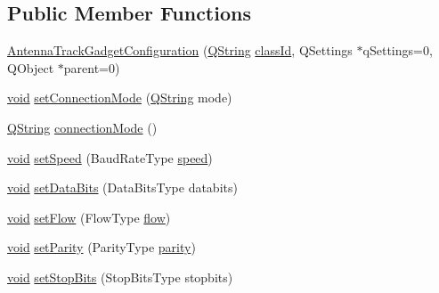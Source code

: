 \subsection*{\-Public \-Member \-Functions}
\begin{DoxyCompactItemize}
\item 
\hyperlink{group___antenna_track_gadget_plugin_gaab0b8cb9542f69d06b53e54d5bb4761a}{\-Antenna\-Track\-Gadget\-Configuration} (\hyperlink{group___u_a_v_objects_plugin_gab9d252f49c333c94a72f97ce3105a32d}{\-Q\-String} \hyperlink{group___core_plugin_gac953657221ba7fda967ada0408332641}{class\-Id}, \-Q\-Settings $\ast$q\-Settings=0, \-Q\-Object $\ast$parent=0)
\item 
\hyperlink{group___u_a_v_objects_plugin_ga444cf2ff3f0ecbe028adce838d373f5c}{void} \hyperlink{group___antenna_track_gadget_plugin_gaa8c80d59aa822d7e1a73288f8da1447d}{set\-Connection\-Mode} (\hyperlink{group___u_a_v_objects_plugin_gab9d252f49c333c94a72f97ce3105a32d}{\-Q\-String} mode)
\item 
\hyperlink{group___u_a_v_objects_plugin_gab9d252f49c333c94a72f97ce3105a32d}{\-Q\-String} \hyperlink{group___antenna_track_gadget_plugin_ga016616d69e43834c0b010babbbb20b04}{connection\-Mode} ()
\item 
\hyperlink{group___u_a_v_objects_plugin_ga444cf2ff3f0ecbe028adce838d373f5c}{void} \hyperlink{group___antenna_track_gadget_plugin_ga657a8ae2f677f817ea6378959145290c}{set\-Speed} (\-Baud\-Rate\-Type \hyperlink{group___antenna_track_gadget_plugin_ga9f04acbb3e66e621c35afaa756e61cb0}{speed})
\item 
\hyperlink{group___u_a_v_objects_plugin_ga444cf2ff3f0ecbe028adce838d373f5c}{void} \hyperlink{group___antenna_track_gadget_plugin_ga36f5c3e37039cfa6f3ea79d53339db3f}{set\-Data\-Bits} (\-Data\-Bits\-Type databits)
\item 
\hyperlink{group___u_a_v_objects_plugin_ga444cf2ff3f0ecbe028adce838d373f5c}{void} \hyperlink{group___antenna_track_gadget_plugin_gab8a02ca68afcbac2db3db1df1f777695}{set\-Flow} (\-Flow\-Type \hyperlink{group___antenna_track_gadget_plugin_ga6c02451beb6f94db4d3c67bd13fa9c3e}{flow})
\item 
\hyperlink{group___u_a_v_objects_plugin_ga444cf2ff3f0ecbe028adce838d373f5c}{void} \hyperlink{group___antenna_track_gadget_plugin_gae386222c5ab2b4132f1f09afd058f48f}{set\-Parity} (\-Parity\-Type \hyperlink{group___antenna_track_gadget_plugin_ga24493de658f97012f89d15d6058bc1f7}{parity})
\item 
\hyperlink{group___u_a_v_objects_plugin_ga444cf2ff3f0ecbe028adce838d373f5c}{void} \hyperlink{group___antenna_track_gadget_plugin_ga35eed481804afdc5eaff1273278718f2}{set\-Stop\-Bits} (\-Stop\-Bits\-Type stopbits)

\end{DoxyCompactItemize}
